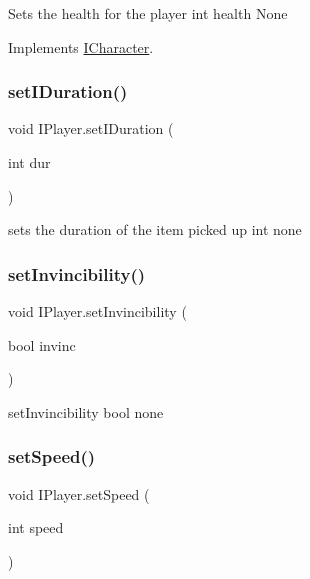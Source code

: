 Sets the health for the player  int health  None 

Implements \mbox{\hyperlink{interface_i_character}{I\+Character}}.

\mbox{\label{class_i_player_a0a2ab5ba7ee4bfbba5e66f79315dd58c}} 
\subsubsection{\texorpdfstring{set\+I\+Duration()}{setIDuration()}}
{\footnotesize\ttfamily void I\+Player.\+set\+I\+Duration (\begin{DoxyParamCaption}\item[{int}]{dur }\end{DoxyParamCaption})\hspace{0.3cm}{\ttfamily [inline]}}

sets the duration of the item picked up  int  none \mbox{\label{class_i_player_a2023f2ac17d8b79bb7f6d1830eca938f}} 
\subsubsection{\texorpdfstring{set\+Invincibility()}{setInvincibility()}}
{\footnotesize\ttfamily void I\+Player.\+set\+Invincibility (\begin{DoxyParamCaption}\item[{bool}]{invinc }\end{DoxyParamCaption})\hspace{0.3cm}{\ttfamily [inline]}}

set\+Invincibility  bool  none \mbox{\label{class_i_player_a073e6b521b71c82a8e8d380ae991236f}} 
\subsubsection{\texorpdfstring{set\+Speed()}{setSpeed()}}
{\footnotesize\ttfamily void I\+Player.\+set\+Speed (\begin{DoxyParamCaption}\item[{int}]{speed }\end{DoxyParamCaption})\hspace{0.3cm}{\ttfamily [inline]}}

